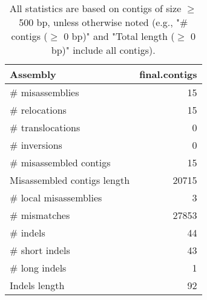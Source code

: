 \documentclass[12pt,a4paper]{article}
\begin{document}
\begin{table}[ht]
\begin{center}
\caption{All statistics are based on contigs of size $\geq$ 500 bp, unless otherwise noted (e.g., "\# contigs ($\geq$ 0 bp)" and "Total length ($\geq$ 0 bp)" include all contigs).}
\begin{tabular}{|l*{1}{|r}|}
\hline
Assembly & final.contigs \\ \hline
\# misassemblies & 15 \\ \hline
\hspace{5mm}\# relocations & 15 \\ \hline
\hspace{5mm}\# translocations & 0 \\ \hline
\hspace{5mm}\# inversions & 0 \\ \hline
\# misassembled contigs & 15 \\ \hline
Misassembled contigs length & 20715 \\ \hline
\# local misassemblies & 3 \\ \hline
\# mismatches & 27853 \\ \hline
\# indels & 44 \\ \hline
\hspace{5mm}\# short indels & 43 \\ \hline
\hspace{5mm}\# long indels & 1 \\ \hline
Indels length & 92 \\ \hline
\end{tabular}
\end{center}
\end{table}
\end{document}
